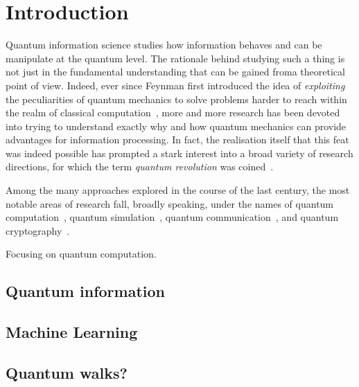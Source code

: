 \chapter{Introduction}

Quantum information science studies how information behaves and can be manipulate at the quantum level.
The rationale behind studying such a thing is not just in the fundamental understanding that can be gained froma theoretical point of view. Indeed, ever since Feynman first introduced the idea of \emph{exploiting} the peculiarities of quantum mechanics to solve problems harder to reach within the realm of classical computation~\cite{feynman1982simulating}, more and more research has been devoted into trying to understand exactly why and how quantum mechanics can provide advantages for information processing.
In fact, the realisation itself that this feat was indeed possible has prompted a stark interest into a broad variety of research directions, for which the term \emph{quantum revolution} was coined~\cite{dowling2003quantum}.

Among the many approaches explored in the course of the last century, the most notable areas of research fall, broadly speaking, under the names of quantum computation~\cite{shor1997polynomial}, quantum simulation~\cite{lloyd1996universal}, quantum communication~\cite{bennett1993teleporting}, and quantum cryptography~\cite{bennett2014quantum}.

Focusing on quantum computation.


\section{Quantum information}

\section{Machine Learning}

\section{Quantum walks?}
